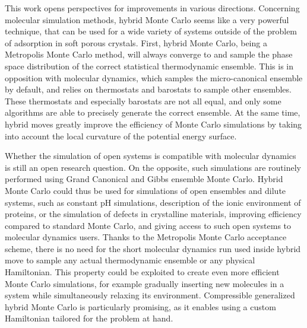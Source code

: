 \begin{center}
\end{center}

This work opens perspectives for improvements in various directions. Concerning
molecular simulation methods, hybrid Monte Carlo seems like a very powerful
technique, that can be used for a wide variety of systems outside of the problem
of adsorption in soft porous crystals. First, hybrid Monte Carlo, being a
Metropolis Monte Carlo method, will always converge to and sample the phase
space distribution of the correct statistical thermodynamic ensemble. This is in
opposition with molecular dynamics, which samples the micro-canonical ensemble
by default, and relies on thermostats and barostats to sample other ensembles.
These thermostats and especially barostats are not all equal, and only some
algorithms are able to precisely generate the correct ensemble. At the same
time, hybrid moves greatly improve the efficiency of Monte Carlo simulations by
taking into account the local curvature of the potential energy surface.

Whether the simulation of open systems is compatible with molecular dynamics is
still an open research question. On the opposite, such simulations are routinely
performed using Grand Canonical and Gibbs ensemble Monte Carlo. Hybrid Monte
Carlo could thus be used for simulations of open ensembles and dilute systems,
such as constant pH simulations, description of the ionic environment of
proteins, or the simulation of defects in crystalline materials, improving
efficiency compared to standard Monte Carlo, and giving access to such open
systems to molecular dynamics users. Thanks to the Metropolis Monte Carlo
acceptance scheme, there is no need for the short molecular dynamics run used
inside hybrid move to sample any actual thermodynamic ensemble or any physical
Hamiltonian. This property could be exploited to create even more efficient
Monte Carlo simulations, for example gradually inserting new molecules in a
system while simultaneously relaxing its environment. Compressible generalized
hybrid Monte Carlo is particularly promising, as it enables using a custom
Hamiltonian tailored for the problem at hand.

